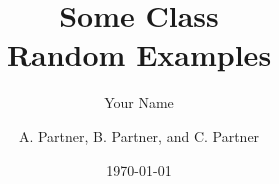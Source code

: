 \documentclass{report}
\title{\Huge{Some Class}\\Random Examples}
\author{\huge{Your Name}}
\date{}
\begin{document}
\title{}
\author{A. Partner, B. Partner, and C. Partner}
\date{\today}
\maketitle
\end{document}
